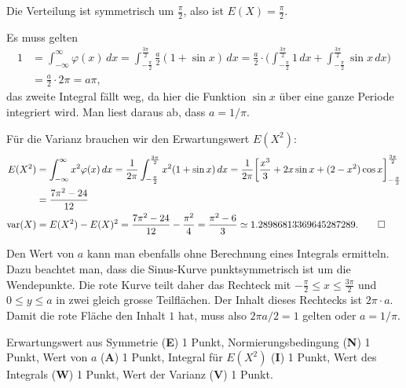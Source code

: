 \begin{loesung}
\begin{teilaufgaben}
\item
Die Verteilung ist symmetrisch um $\frac{\pi}2$, also ist
$E(X)=\frac{\pi}2$.
\item
Es muss gelten
\begin{align*}
1
&=
\int_{-\infty}^{\infty}\varphi(x)\,dx
=
\int_{-\frac{\pi}2}^{\frac{3\pi}2} \frac{a}2(1+\sin x)\,dx
=
\frac{a}2\cdot \biggl(
\int_{-\frac{\pi}2}^{\frac{3\pi}2} 1\,dx
+
\int_{-\frac{\pi}2}^{\frac{3\pi}2} \sin x\,dx
\biggr)
\\
&=
\frac{a}2\cdot 2\pi
=
a\pi
,
\end{align*}
das zweite Integral fällt weg, da hier die Funktion $\sin x$ über eine
ganze Periode integriert wird.
Man liest daraus ab, dass  $a=1/\pi$.
\item
Für die Varianz brauchen wir den Erwartungswert $E(X^2)$:
\begin{align*}
E(X^2)
&=
\int_{-\infty}^{\infty} x^2\varphi(x)\,dx
=
\frac1{2\pi}
\int_{-\frac{\pi}2}^{\frac{3\pi}2} x^2(1+\sin x)\,dx
=
\frac1{2\pi}
\biggl[
\frac{x^3}3
+2x\sin x + (2-x^2)\cos x
\biggr]_{-\frac{\pi}2}^{\frac{3\pi}2}
\\
&=
\frac{7\pi^2-24}{12}
\\
\operatorname{var}(X)
&=
E(X^2)-E(X)^2
=
\frac{7\pi^2-24}{12}
-
\frac{\pi^2}{4}
=
\frac{\pi^2-6}{3} \simeq 1.28986813369645287289.
\qedhere
\end{align*}
\end{teilaufgaben}
\end{loesung}


\begin{diskussion}
Den Wert von $a$ kann man ebenfalls ohne Berechnung eines Integrals
ermitteln.
Dazu beachtet man, dass die Sinus-Kurve punktsymmetrisch ist um die
Wendepunkte.
Die rote Kurve teilt daher das Rechteck mit
$-\frac{\pi}2 \le x\le \frac{3\pi}2$ und $0\le y\le a$ in zwei gleich
grosse Teilflächen.
Der Inhalt dieses Rechtecks ist $2\pi\cdot a$.
Damit die rote Fläche den Inhalt $1$ hat, muss also $2\pi a/2 = 1$ gelten
oder $a = 1/\pi$.
\end{diskussion}

\begin{bewertung}
Erwartungswert aus Symmetrie ({\bf E}) 1 Punkt,
Normierungsbedingung ({\bf N}) 1 Punkt,
Wert von $a$ ({\bf A}) 1 Punkt,
Integral für $E(X^2)$ ({\bf I}) 1 Punkt,
Wert des Integrals ({\bf W}) 1 Punkt,
Wert der Varianz ({\bf V}) 1 Punkt.
\end{bewertung}



